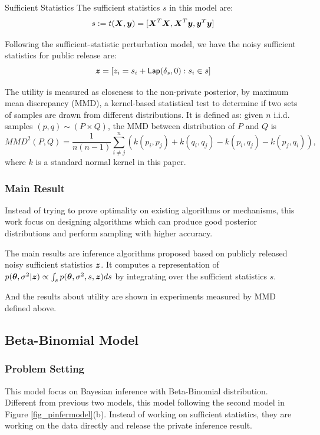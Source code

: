 \documentclass{article}
\begin{document}
\begin{defn}{Sufficient Statistics}
The sufficient statistics $s$ in this model are:
\[
	s := t(\boldsymbol{X}, \boldsymbol{y}) = [\boldsymbol{X}^T \boldsymbol{X}, \boldsymbol{X}^T \boldsymbol{y}, \boldsymbol{y}^T\boldsymbol{y}]
\]
\end{defn}

\begin{defn}
Following the sufficient-statistic perturbation model, we have the noisy sufficient statistics for public release are:
\[
	\boldsymbol{z} = [z_i = s_i + \mathsf{Lap}(\delta_s, 0) : s_i \in s]
\]
\end{defn}


\begin{defn}
The utility is measured as closeness to the non-private posterior, by maximum mean discrepancy (MMD), a kernel-based statistical test to determine if two sets of samples are drawn from different distributions. It is defined as: given $n$ i.i.d. samples $(p, q) \sim (P \times Q)$, the MMD between distribution of $P$ and $Q$ is
\[
	MMD^2(P, Q) = \frac{1}{n(n - 1)}
	\sum_{i \neq j}^{n}
	(k(p_i, p_j ) + k(q_i, q_j ) 
	- k(p_i, q_j ) - k(p_j , q_i)),
\]
where $k$ is a standard normal kernel in this paper.
\end{defn}
%
%
\subsubsection{Main Result}
%
Instead of trying to prove optimality on existing algorithms or mechanisms, this work focus on designing algorithms which can produce good posterior distributions and perform sampling with higher accuracy.
%

The main results are inference algorithms proposed based on publicly released noisy sufficient statistics $\boldsymbol{z}$. 
It computes a representation of
$ p(\boldsymbol{\theta}, \sigma^2 | \boldsymbol{z}) \propto \int_{s}   p( \boldsymbol{\theta}, \sigma^2, s, \boldsymbol{z}) ds$ by integrating over the sufficient statistics $s$.

%
%
And the results about utility are shown in experiments measured by MMD defined above.

\subsection{Beta-Binomial Model
\texorpdfstring{\cite{Zhang2017privbayes}}{}}
\label{sec_betabi}
%

\subsubsection{Problem Setting}
%
This model focus on Bayesian inference with Beta-Binomial distribution.
%
Different from previous two models, this model following the second model in Figure \ref{fig_pinfermodel}(b). Instead of working on sufficient statistics, they are working on the data directly and release the private inference result. 
\end{document}
